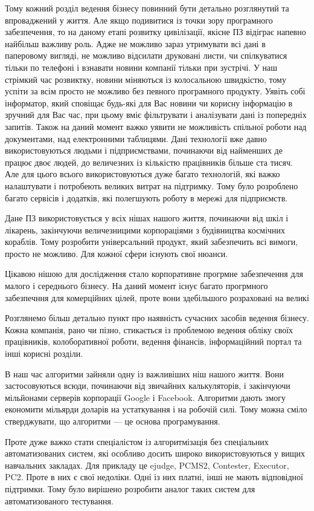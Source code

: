 Тому кожний розділ ведення бізнесу повинний бути детально розглянутий та впроваджений у життя. 
Але якщо подивитися із точки зору програмного забезпечення, то на даному етапі розвитку цивілізації, якісне ПЗ відіграє напевно найбільш важливу роль. 
Адже не можливо зараз утримувати всі дані в паперовому вигляді, не можливо відсилати друковані листи, чи спілкуватися тільки по телефоні і взнавати новини компанії тільки при зустрічі. 
У наш стрімкий час розвиктку, новини міняються із колосальною швидкістю, тому успіти за всім просто не можливо без певного програмного продукту. 
Уявіть собі інформатор, який сповіщає будь-які для Вас новини чи корисну інформацію в зручний для Вас час, при цьому вміє фільтрувати і аналізувати дані із попередніх запитів. 
Також на даний момент важко уявити не можливість спільної роботи над документами, над електронними таблицями. 
Дані технології вже давно використовуються людьми і підприємствами, починаючи від найменших де працює двоє людей, до величезних із кількістю працівників більше ста тисяч. 
Але для цього всього використовуються дуже багато технологій, які важко налаштувати і потробеють великих витрат на підтримку.
Тому було розроблено багато сервісів і додатків, які полегшують роботу в мережі для підприємств.
\par Дане ПЗ використовується у всіх нішах нашого життя, починаючи від шкіл і лікарень, закінчуючи величезницими корпораціями з будівництва космічних кораблів. 
Тому розробити універсальний продукт, який забезпечить всі вимоги, просто не можливо. 
Для кожної сфери існують свої нюанси.
\par Цікавою нішою для дослідження стало корпоративне прогрмне забезпечення для малого і середнього бізнесу.
 На даний момент існує багато прогрмного забезпечння для комерційних цілей, проте вони здебільшого розраховані на великі 


Розглянемо більш детально пункт про наявність сучасних засобів ведення бізнесу. Кожна компанія, рано чи пізно, стикається із проблемою ведення обліку своїх працівників, колоборативної роботи, ведення фінансів, інформаційний портал та інші корисні розділи.





В наш час алгоритми зайняли одну із важливіших ніш нашого життя. Вони застосовуються всюди, починаючи від звичайних калькуляторів, і закінчуючи мільйонами серверів корпорації Google і  Facebook. Алгоритми дають змогу економити мільярди доларів на устаткування і на робочій силі. Тому можна сміло стверджувати, що алгоритми --- це основа програмування.
\par Проте дуже важко стати спеціалістом із алгоритмізація без спеціальних автоматизованих систем, які особливо досить широко використовуються у вищих навчальних закладах. Для прикладу це ejudge, PCMS2, Contester, Executor, PC2. Проте в них є свої недоліки. Одні із них платні, інші не мають відповідної підтримки. Тому було вирішено розробити аналог таких систем для автоматизованого тестування.

